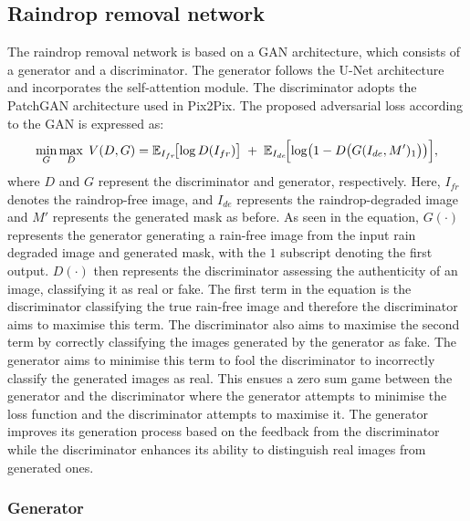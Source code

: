 \documentclass[11pt]{ociamthesis}  %
\begin{document}
\subsection{Raindrop removal network}

The raindrop removal network is based on a GAN architecture, which consists of a generator and a discriminator. The generator follows the U-Net architecture and incorporates the self-attention module. The discriminator adopts the PatchGAN\cite{PatchGAN} architecture used in Pix2Pix\cite{isola2017image}. The proposed adversarial loss according to the GAN is expressed as:
\noindent
\begin{equation}
\min_{G} \max_{D} \; V(D, G) 
= \mathbb{E}_{I_{fr}}\!\bigl[\log D(I_{fr})\bigr] 
\;+\; \mathbb{E}_{I_{de}}\!\Bigl[\log\bigl(1 - D\bigl(G(I_{de}, M')_1\bigr)\bigr)\Bigr],
\end{equation}
\noindent where $D$ and $G$ \noindent represent the discriminator and generator, respectively. Here, \( I_{fr} \) denotes the raindrop-free image, and \( I_{de} \) represents the raindrop-degraded image and $M'$ represents the generated mask as before. As seen in the equation, $G(\cdot)$ represents the generator generating a rain-free image from the input rain degraded image and generated mask, with the $1$ subscript denoting the first output. $D(\cdot)$ then represents the discriminator assessing the authenticity of an image, classifying it as real or fake. The first term in the equation is the discriminator classifying the true rain-free image and therefore the discriminator aims to maximise this term. The discriminator also aims to maximise the second term by correctly classifying the images generated by the generator as fake. The generator aims to minimise this term to fool the discriminator to incorrectly classify the generated images as real. This ensues a zero sum game between the generator and the discriminator where the generator attempts to minimise the loss function and the discriminator attempts to maximise it. The generator improves its generation process based on the feedback from the discriminator while the discriminator enhances its ability to distinguish real images from generated ones.

\subsubsection{Generator}
\end{document}
